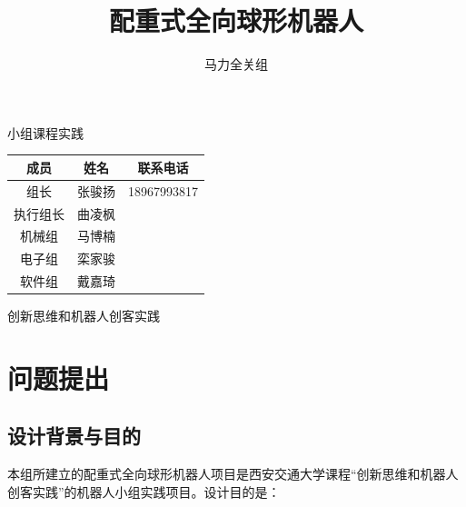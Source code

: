 \documentclass[a4paper]{ctexart}
\title{配重式全向球形机器人}
\author{马力全关组}
\numberwithin{equation}{section}
\numberwithin{table}{section}
\numberwithin{figure}{section}
\begin{document}


\begin{titlepage}

  \maketitle
  \begin{center}
    小组课程实践
  \end{center}


  \begin{longtable}[]{@{}ccc@{}}
  \toprule
  成员 & 姓名 & 联系电话\tabularnewline
  \midrule
  \endhead
  组长 & 张骏扬 & 18967993817\tabularnewline
  执行组长 & 曲凌枫 & \tabularnewline
  机械组 & 马博楠 & \tabularnewline
  电子组 & 栾家骏 & \tabularnewline
  软件组 & 戴嘉琦 & \tabularnewline
  \bottomrule
  \end{longtable}
  \addtocounter{table}{-1}

  
\begin{center}
  创新思维和机器人创客实践
\end{center}

\thispagestyle{empty}

\end{titlepage}

\addtocounter{page}{-2}

\newpage

\thispagestyle{fancy}
\lhead{}
\chead{\it\small{\textcolor{grey}{目录}}}
\rhead{}
\cfoot{}

\tableofcontents

\newpage


\pagestyle{fancy}
\fancyhead[RE, LO]{\it\small\rightmark}
\fancyhead[C]{\small{\it\textcolor{grey}{配重式球形机器人}}}

\section{问题提出}

\subsection{设计背景与目的}

本组所建立的配重式全向球形机器人项目是西安交通大学课程“创新思维和机器人创客实践”的机器人小组实践项目。设计目的是：
\end{document}
